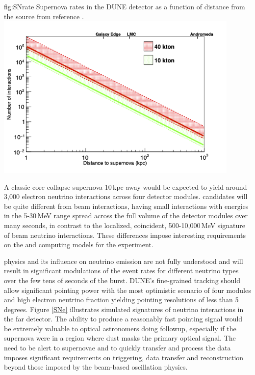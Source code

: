 \documentclass[../main-v1.tex]{subfiles}
\begin{document}
\begin{dunefigure}
{fig:SNrate}
{Supernova rates in the DUNE detector  as a function of distance from the source from reference \cite{DUNE:2020zfm}.}
{\includegraphics[width=0.9\textwidth]{graphics/IntroFigures/argon_sn.png}}
\end{dunefigure}

A classic core-collapse supernova 10\,kpc away would be expected to yield around 3,000   electron neutrino interactions across four detector modules.  candidates will be quite different from beam interactions, having small interactions with energies in the 5-30\,MeV range spread across the full volume of the detector modules over many seconds, in contrast to the localized, coincident,  500-10,000\,MeV signature of beam neutrino interactions. These differences impose interesting requirements on the  and computing models for the experiment.  


 physics and its influence on neutrino emission are not fully understood and will result in significant modulations of the event rates for different neutrino types  over the few tens of seconds of the burst.  DUNE's fine-grained tracking should allow significant pointing power with the most optimistic scenario of four modules and high electron neutrino fraction yielding pointing resolutions of less than 5 degrees.   Figure \ref{SNe} illustrates simulated signatures of  neutrino interactions in the far detector. The ability to produce a reasonably fast pointing signal would be extremely valuable to optical astronomers doing followup, especially if the supernova were in a region where dust masks the primary optical signal.   The need to be alert to supernovae and to quickly transfer and process the data imposes significant requirements on triggering, data transfer and reconstruction beyond those imposed by the %
beam-based oscillation physics. 
\end{document}
